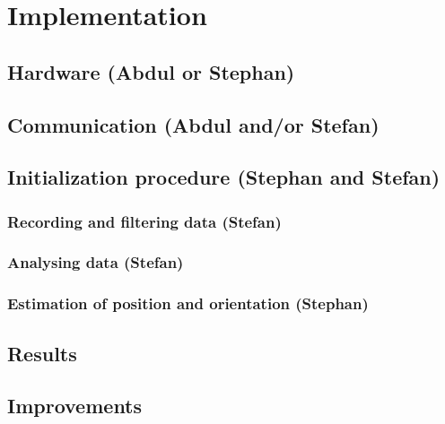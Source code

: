 \section{Implementation}

\subsection{Hardware (Abdul or Stephan)}

\subsection{Communication (Abdul and/or Stefan)}

\subsection{Initialization procedure (Stephan and Stefan)}

\subsubsection{Recording and filtering data (Stefan)}

\subsubsection{Analysing data (Stefan)}

\subsubsection{Estimation of position and orientation (Stephan)}

\subsection{Results}

\subsection{Improvements}

